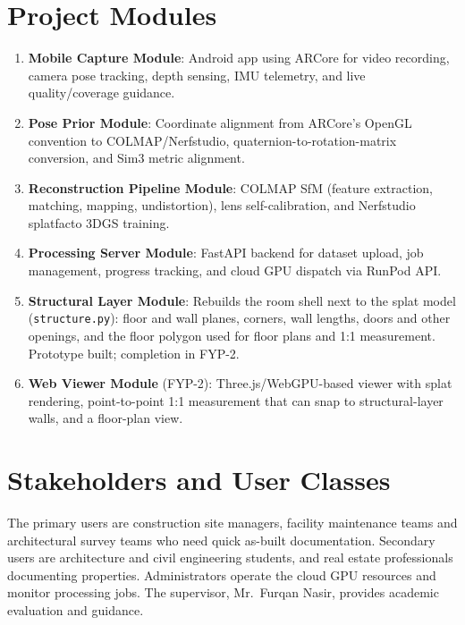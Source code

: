 \section{Project Modules}
\begin{enumerate}
    \item \textbf{Mobile Capture Module}: Android app using ARCore for video recording, camera pose tracking, depth sensing, IMU telemetry, and live quality/coverage guidance.
    \item \textbf{Pose Prior Module}: Coordinate alignment from ARCore's OpenGL convention to COLMAP/Nerfstudio, quaternion-to-rotation-matrix conversion, and Sim3 metric alignment.
    \item \textbf{Reconstruction Pipeline Module}: COLMAP SfM (feature extraction, matching, mapping, undistortion), lens self-calibration, and Nerfstudio splatfacto 3DGS training.
    \item \textbf{Processing Server Module}: FastAPI backend for dataset upload, job management, progress tracking, and cloud GPU dispatch via RunPod API.
    \item \textbf{Structural Layer Module}: Rebuilds the room shell next to the splat model (\texttt{structure.py}): floor and wall planes, corners, wall lengths, doors and other openings, and the floor polygon used for floor plans and 1:1 measurement. Prototype built; completion in FYP-2.
    \item \textbf{Web Viewer Module} (FYP-2): Three.js/WebGPU-based viewer with splat rendering, point-to-point 1:1 measurement that can snap to structural-layer walls, and a floor-plan view.
\end{enumerate}

\section{Stakeholders and User Classes}
The primary users are construction site managers, facility maintenance teams and architectural survey teams who need quick as-built documentation. Secondary users are architecture and civil engineering students, and real estate professionals documenting properties. Administrators operate the cloud GPU resources and monitor processing jobs. The supervisor, Mr.~Furqan Nasir, provides academic evaluation and guidance.

